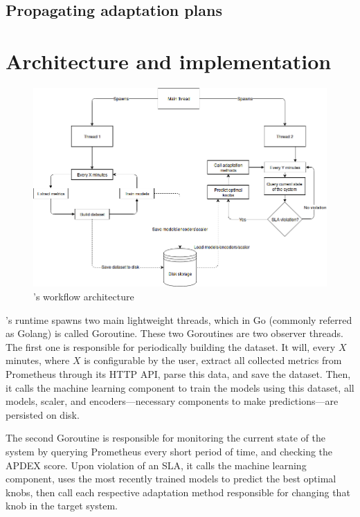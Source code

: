 \subsection{Propagating adaptation plans}

\section{Architecture and implementation}

\begin{figure}[t]
  \includegraphics[scale=0.5]{images/FinchArchitecture.png}
  \caption{\projectname{}'s workflow architecture}
  \label{fig:finch2}
\end{figure}

\projectname{}'s runtime spawns two main lightweight threads, which in Go (commonly referred as Golang) is called Goroutine. These two Goroutines are two observer threads. The first one is responsible for periodically building the dataset. It will, every $X$ minutes, where $X$ is configurable by the user, extract all collected metrics from Prometheus through its HTTP API, parse this data, and save the dataset. Then, it calls the machine learning component to train the models using this dataset, all models, scaler, and encoders---necessary components to make predictions---are persisted on disk.

The second Goroutine is responsible for monitoring the current state of the system by querying Prometheus every short period of time, and checking the APDEX score. Upon violation of an SLA, it calls the machine learning component, uses the most recently trained models to predict the best optimal knobs, then call each respective adaptation method responsible for changing that knob in the target system.

